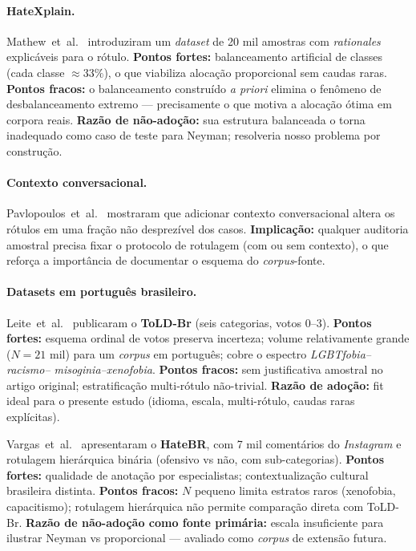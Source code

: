 \paragraph{HateXplain.}
Mathew~et~al.~\cite{mathew2021} introduziram um \textit{dataset} de 20 mil
amostras com \textit{rationales} explicáveis para o rótulo. \textbf{Pontos
fortes:} balanceamento artificial de classes (cada classe $\approx 33\%$),
o que viabiliza alocação proporcional sem caudas raras. \textbf{Pontos fracos:}
o balanceamento construído \textit{a priori} elimina o fenômeno de
desbalanceamento extremo --- precisamente o que motiva a alocação ótima
em corpora reais. \textbf{Razão de não-adoção:} sua estrutura balanceada o
torna inadequado como caso de teste para Neyman; resolveria nosso problema
por construção.

\paragraph{Contexto conversacional.}
Pavlopoulos~et~al.~\cite{pavlopoulos2020} mostraram que adicionar contexto
conversacional altera os rótulos em uma fração não desprezível dos casos.
\textbf{Implicação:} qualquer auditoria amostral precisa fixar o protocolo
de rotulagem (com ou sem contexto), o que reforça a importância de
documentar o esquema do \textit{corpus}-fonte.

\paragraph{Datasets em português brasileiro.}
Leite~et~al.~\cite{leite2020,leite2020_thesis} publicaram o \textbf{ToLD-Br}
(seis categorias, votos $0$--$3$). \textbf{Pontos fortes:} esquema ordinal de
votos preserva incerteza; volume relativamente grande ($N=21$ mil) para um
\textit{corpus} em português; cobre o espectro \textit{LGBTfobia–racismo–
misoginia–xenofobia}. \textbf{Pontos fracos:} sem justificativa amostral no
artigo original; estratificação multi-rótulo não-trivial.
\textbf{Razão de adoção:} fit ideal para o presente estudo (idioma, escala,
multi-rótulo, caudas raras explícitas).

Vargas~et~al.~\cite{vargas2022hatebr,vargas2022_thesis} apresentaram o
\textbf{HateBR}, com 7 mil comentários do \textit{Instagram} e rotulagem
hierárquica binária (ofensivo vs não, com sub-categorias).
\textbf{Pontos fortes:} qualidade de anotação por especialistas;
contextualização cultural brasileira distinta. \textbf{Pontos fracos:}
$N$ pequeno limita estratos raros (xenofobia, capacitismo); rotulagem
hierárquica não permite comparação direta com ToLD-Br.
\textbf{Razão de não-adoção como fonte primária:} escala insuficiente para
ilustrar Neyman vs proporcional --- avaliado como \textit{corpus} de
extensão futura.

